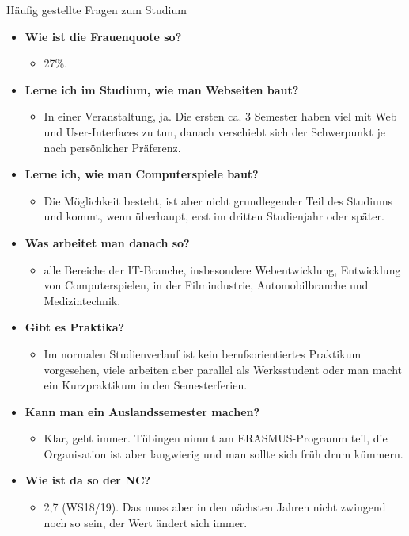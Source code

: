 \begin{block}{Häufig gestellte Fragen zum Studium}
\begin{large}
\begin{itemize}
\item \textbf{Wie ist die Frauenquote so?}
\begin{itemize}
	\item 27\%.
\end{itemize}

\item \textbf{Lerne ich im Studium, wie man Webseiten baut?}
\begin{itemize}
	\item In einer Veranstaltung, ja. Die ersten ca. 3 Semester haben viel mit Web und User-Interfaces zu tun, danach verschiebt sich der Schwerpunkt je nach persönlicher Präferenz.
\end{itemize}

\item \textbf{Lerne ich, wie man Computerspiele baut?}
\begin{itemize}
	\item Die Möglichkeit besteht, ist aber nicht grundlegender Teil des Studiums und kommt, wenn überhaupt, erst im dritten Studienjahr oder später.
\end{itemize}

\item \textbf{Was arbeitet man danach so?}
\begin{itemize}
	\item alle Bereiche der IT-Branche, insbesondere Webentwicklung, Entwicklung von Computerspielen, in der Filmindustrie, Automobilbranche und Medizintechnik.
\end{itemize}

\item \textbf{Gibt es Praktika?}
\begin{itemize}
	\item Im normalen Studienverlauf ist kein berufsorientiertes Praktikum vorgesehen, viele arbeiten aber parallel als Werksstudent oder man macht ein Kurzpraktikum in den Semesterferien.
\end{itemize}

\item \textbf{Kann man ein Auslandssemester machen?}
\begin{itemize}
	\item Klar, geht immer. Tübingen nimmt am ERASMUS-Programm teil, die Organisation ist aber langwierig und man sollte sich früh drum kümmern.
\end{itemize}

\item \textbf{Wie ist da so der NC?}
\begin{itemize}
	\item 2,7 (WS18/19). Das muss aber in den nächsten Jahren nicht zwingend noch so sein, der Wert ändert sich immer.
\end{itemize}

\end{itemize}

\end{large}
\end{block}